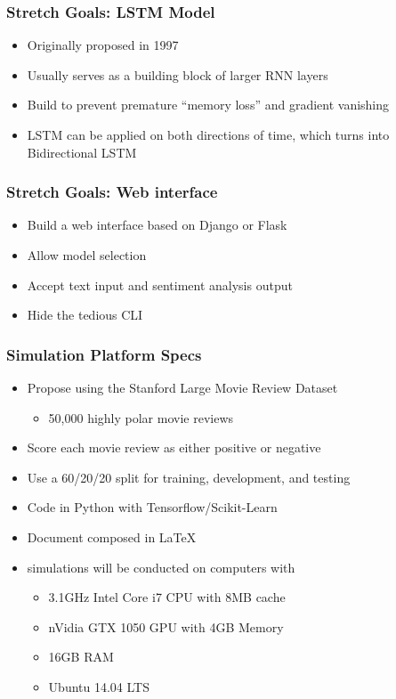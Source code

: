 \documentclass{beamer}
\begin{document}
\begin{frame}
\frametitle{Stretch Goals: LSTM Model}
    \begin{itemize}
        \item Originally proposed in 1997
        \item Usually serves as a building block of larger RNN layers
        \item Build to prevent premature ``memory loss'' and gradient vanishing
        \item LSTM can be applied on both directions of time, which turns into
        Bidirectional LSTM
    \end{itemize}
\end{frame}

\begin{frame}
\frametitle{Stretch Goals: Web interface}
    \begin{itemize}
        \item Build a web interface based on Django or Flask
        \item Allow model selection
        \item Accept text input and sentiment analysis output
        \item Hide the tedious CLI
    \end{itemize}
\end{frame}

\begin{frame}
\frametitle{Simulation Platform Specs}
    \begin{itemize}
        \item Propose using the Stanford Large Movie Review Dataset
        \begin{itemize}
            \item 50,000 highly polar movie reviews
        \end{itemize}
        \item Score each movie review as either positive or negative
        \item Use a 60/20/20 split for training, development, and testing
        \item Code in Python with Tensorflow/Scikit-Learn
        \item Document composed in \LaTeX
        \item simulations will be conducted on computers with 
        \begin{itemize}
            \item 3.1GHz Intel Core i7 CPU with 8MB cache
            \item nVidia GTX 1050 GPU with 4GB Memory
            \item 16GB RAM
            \item Ubuntu 14.04 LTS
        \end{itemize}
    \end{itemize}
\end{frame}
\end{document}
